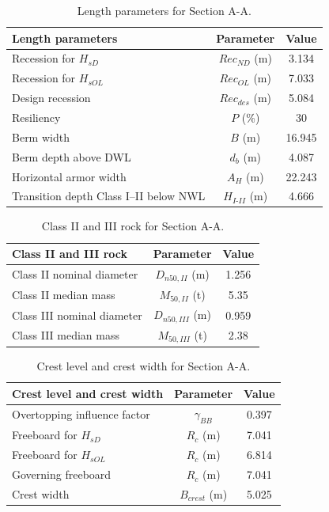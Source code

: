 \documentclass[a4paper, 11pt]{article}
\begin{document}
\begin{table}[H]
\centering
\caption{Length parameters for Section A-A.}
\label{tab:length_params}
\begin{tabular}{lcc}
\hline
Length parameters & Parameter & Value \\
\hline
Recession for $H_{sD}$ & $Rec_{ND}$ (m) & 3.134 \\
Recession for $H_{sOL}$ & $Rec_{OL}$ (m) & 7.033 \\
Design recession & $Rec_{des}$ (m) & 5.084 \\
Resiliency & $P$ (\%) & 30 \\
Berm width & $B$ (m) & 16.945 \\
Berm depth above DWL & $d_b$ (m) & 4.087 \\
Horizontal armor width & $A_H$ (m) & 22.243 \\
Transition depth Class I--II below NWL & $H_{I\text{-}II}$ (m) & 4.666 \\
\hline
\end{tabular}
\end{table}

\begin{table}[H]
\centering
\caption{Class II and III rock for Section A-A.}
\label{tab:class_IIIII}
\begin{tabular}{lcc}
\hline
Class II and III rock & Parameter & Value \\
\hline
Class II nominal diameter & $D_{n50,II}$ (m) & 1.256 \\
Class II median mass & $M_{50,II}$ (t) & 5.35 \\
Class III nominal diameter & $D_{n50,III}$ (m) & 0.959 \\
Class III median mass & $M_{50,III}$ (t) & 2.38 \\
\hline
\end{tabular}
\end{table}

\begin{table}[H]
\centering
\caption{Crest level and crest width for Section A-A.}
\label{tab:crest}
\begin{tabular}{lcc}
\hline
Crest level and crest width & Parameter & Value \\
\hline
Overtopping influence factor & $\gamma_{BB}$ & 0.397 \\
Freeboard for $H_{sD}$ & $R_c$ (m) & 7.041 \\
Freeboard for $H_{sOL}$ & $R_c$ (m) & 6.814 \\
Governing freeboard & $R_c$ (m) & 7.041 \\
Crest width & $B_{crest}$ (m) & 5.025 \\
\hline
\end{tabular}
\end{table}
\end{document}
